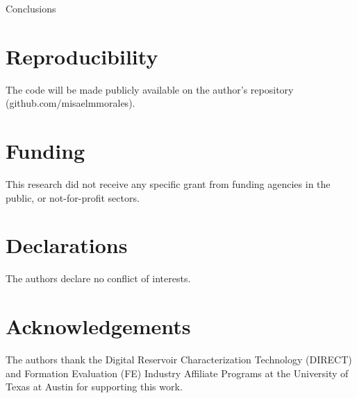 \documentclass[10pt, twoside]{article}
\begin{document}
Conclusions

\section*{\textbf{Reproducibility}}
The code will be made publicly available on the author's repository (github.com/misaelmmorales).

\section*{\textbf{Funding}}
This research did not receive any specific grant from funding agencies in the public, or not-for-profit sectors.

\section*{\textbf{Declarations}}
The authors declare no conflict of interests.

\section*{\textbf{Acknowledgements}}
The authors thank the Digital Reservoir Characterization Technology (DIRECT) and Formation Evaluation (FE) Industry Affiliate Programs at the University of Texas at Austin for supporting this work.


\end{document}
